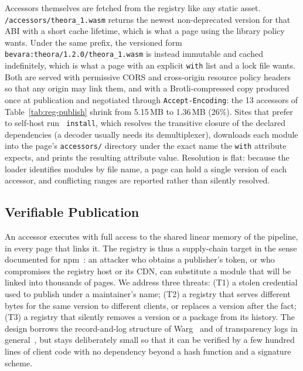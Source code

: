Accessors themselves are fetched from the registry like any static asset.
\texttt{/accessors/theora\_1.wasm} returns the newest non-deprecated version
for that ABI with a short cache lifetime, which is what a page using the
library policy wants. Under the same prefix, the versioned form
\texttt{bevara:theora/1.2.0/theora\_1.wasm} is instead immutable and cached
indefinitely, which is what a page with an explicit
\texttt{with} list and a lock file wants. Both are served with permissive
CORS and cross-origin resource policy headers so that any origin may link
them, and with a Brotli-compressed copy produced once at publication and
negotiated through \texttt{Accept-Encoding}: the 13 accessors of
Table~\ref{tab:reg-publish} shrink from 5.15\,MB to 1.36\,MB (26\%). Sites
that prefer to self-host run \texttt{\toolname{} install}, which resolves the
transitive closure of the declared dependencies (a decoder usually needs its
demultiplexer), downloads each module into the page's \texttt{accessors/}
directory under the exact name the \texttt{with} attribute expects, and prints
the resulting attribute value. Resolution is flat: because the loader
identifies modules by file name, a page can hold a single version of each
accessor, and conflicting ranges are reported rather than silently resolved.

\subsection{Verifiable Publication}
\label{sec:registry-trust}

An accessor executes with full access to the shared linear memory of the
pipeline, in every page that links it. The registry is thus a supply-chain
target in the sense documented for npm~\cite{ohm2020backstabber,
zimmermann2019smallworld}: an attacker who obtains a publisher's token, or who
compromises the registry host or its CDN, can substitute a module that will be
linked into thousands of pages. We address three threats: (T1) a stolen
credential used to publish under a maintainer's name; (T2) a registry that
serves different bytes for the same version to different clients, or replaces
a version after the fact; (T3) a registry that silently removes a version or a
package from its history. The design borrows the record-and-log structure of
Warg~\cite{warg} and of transparency logs in general~\cite{rfc6962,
sigstore2022}, but stays deliberately small so that it can be verified by a
few hundred lines of client code with no dependency beyond a hash function and
a signature scheme.

